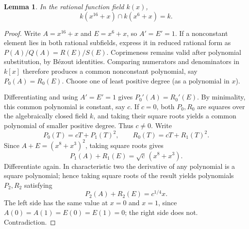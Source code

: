 \documentclass[11pt,a4paper,reqno]{amsart}
\newtheorem{lemma}[theorem]{Lemma}
\begin{document}
\begin{lemma}\label{lem:int2}
In the rational function field $k(x)$,
\begin{equation}\label{eq:int2}
   k(x^{16}+x)\cap k(x^6+x)=k.
\end{equation}
\end{lemma}
\begin{proof}
Write $A=x^{16}+x$ and $E=x^6+x$, so $A'=E'=1$.
If a nonconstant element lies in both rational subfields, express it
in reduced rational form as
$P(A)/Q(A)=R(E)/S(E)$.  Coprimeness remains valid after polynomial
substitution, by B\'ezout identities. Comparing numerators and
denominators in $k[x]$ therefore produces a common nonconstant
polynomial, say $P_0(A)=R_0(E)$. Choose one of least positive degree
(as a polynomial in $x$).

Differentiating and using $A'=E'=1$ gives
$P_0'(A)=R_0'(E)$. By minimality, this common polynomial is constant,
say $c$. If $c=0$, both $P_0,R_0$ are squares over the algebraically
closed field $k$, and taking their square roots yields a common
polynomial of smaller positive degree. Thus $c\ne0$.
Write
\[
 P_0(T)=cT+P_1(T)^2,\qquad
 R_0(T)=cT+R_1(T)^2.
\]
Since $A+E=(x^8+x^3)^2$, taking square roots gives
\begin{equation}\label{eq:sqrt1}
 P_1(A)+R_1(E)=\sqrt c\,(x^8+x^3).
\end{equation}
Differentiate again. In characteristic two the derivative of any
polynomial is a square polynomial; hence taking square roots of the
result yields polynomials $P_2,R_2$ satisfying
\begin{equation}\label{eq:sqrt2}
 P_2(A)+R_2(E)=c^{1/4}x.
\end{equation}
The left side has the same value at $x=0$ and $x=1$, since
$A(0)=A(1)=E(0)=E(1)=0$; the right side does not. Contradiction.
\end{proof}
\end{document}
